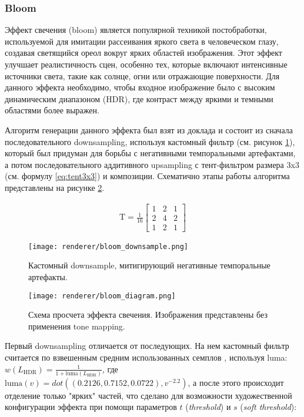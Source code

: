 \subsubsection{Bloom}
Эффект свечения (bloom) является популярной техникой постобработки, используемой для имитации рассеивания яркого света в человеческом глазу, создавая светящийся ореол вокруг ярких областей изображения. Этот эффект улучшает реалистичность сцен, особенно тех, которые включают интенсивные источники света, такие как солнце, огни или отражающие поверхности. Для данного эффекта необходимо, чтобы входное изображение было с высоким динамическим диапазоном (HDR), где контраст между яркими и темными областями более выражен.

Алгоритм генерации данного эффекта был взят из доклада \cite{cod_aw_bloom} и состоит из сначала последовательного downsampling, используя кастомный фильтр (см. рисунок \ref{fig:bloom_downsample}), который был придуман для борьбы с негативными темпоральными артефактами, а потом последовательного аддитивного upsampling с тент-фильтром размера 3x3 (см. формулу \ref{eq:tent3x3}) и композиции. Схематично этапы работы алгоритма представлены на рисунке \ref{fig:bloom_diagram}.

\begin{align}
    \text{T} = \frac{1}{16} \begin{bmatrix}
                                1 & 2 & 1 \\[0.1em]
                                2 & 4 & 2 \\[0.1em]
                                1 & 2 & 1
                            \end{bmatrix} \label{eq:tent3x3}
\end{align}

\begin{figure}[h]
    \centering
    \texttt{[image: renderer/bloom\_downsample.png]}
    \caption{Кастомный downsample, митигирующий негативные темпоральные артефакты.}
    \label{fig:bloom_downsample}
\end{figure}

\begin{figure}[h]
    \centering
    \texttt{[image: renderer/bloom\_diagram.png]}
    \caption{Схема просчета эффекта свечения. Изображения представлены без применения tone mapping.}
    \label{fig:bloom_diagram}
\end{figure}

Первый downsampling отличается от последующих. На нем кастомный фильтр считается по взвешенным средним использованных семплов \cite{karis2014}, используя luma: $w(L_\text{HDR}) = \frac{1}{1 + \text{luma}\left( L_\text{HDR} \right)}$, где $\text{luma}\left( v \right) = dot\left( (0.2126, 0.7152, 0.0722), v^{-2.2} \right)$, а после этого происходит отделение только "ярких" частей, что сделано для возможности художественной конфигурации эффекта при помощи параметров $t$ (\textit{threshold}) и $s$ (\textit{soft threshold}):

